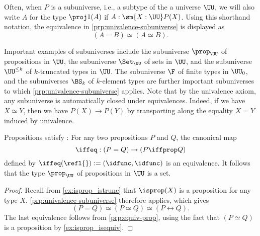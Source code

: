 \begin{rmk}
  Often, when $P$ is a subuniverse, i.e., a subtype of the a universe $\UU$, we will also write $A$ for the type $\proj 1(A)$ if $A:\sm{X:\UU}P(X)$. Using this shorthand notation, the equivalence in \cref{prp:univalence-subuniverse} is displayed as
  \begin{equation*}
    (A=B)\simeq (A\simeq B).
  \end{equation*}
\end{rmk}

Important examples of subuniverses include the subuniverse $\prop_\UU$ of propositions in $\UU$, the subuniverse $\Set_\UU$ of sets in $\UU$, and the subuniverse $\UU^{\leq k}$ of $k$-truncated types in $\UU$. The subuniverse $\F$ of finite types in $\UU_0$, and the subuniverses $\BS_k$ of $k$-element types are further important subuniverses to which \cref{prp:univalence-subuniverse} applies. Note that by the univalence axiom, any subuniverse is automatically closed under equivalences. Indeed, if we have $X\simeq Y$, then we have $P(X)\to P(Y)$ by transporting along the equality $X=Y$ induced by univalence.

\begin{thm}\label{prp:propositional-extensionality}
  Propositions satisfy :
  For any two propositions $P$ and $Q$, the canonical map
  \begin{equation*}
    \iffeq:(P=Q)\to (P\iffprop Q)
  \end{equation*}
  defined by $\iffeq(\refl{}):=(\idfunc,\idfunc)$ is an equivalence. It follows that the type $\prop_\UU$ of propositions in $\UU$ is a set.
\end{thm}

\begin{proof}
  Recall from \cref{ex:isprop_istrunc} that $\isprop(X)$ is a proposition for any type $X$. \cref{prp:univalence-subuniverse} therefore applies, which gives
  \begin{equation*}
    (P=Q)\simeq (P\simeq Q)\simeq (P\leftrightarrow Q).
  \end{equation*}
  The last equivalence follows from \cref{prp:equiv-prop}, using the fact that $(P\simeq Q)$ is a proposition by \cref{ex:isprop_isequiv}.
\end{proof}

